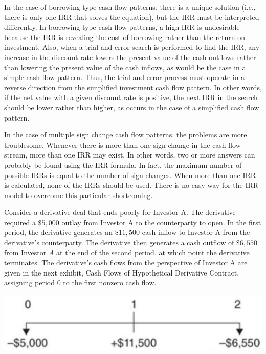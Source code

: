 \documentclass[11pt]{article}
\begin{document}
In the case of borrowing type cash flow patterns, there is a unique solution (i.e., there is only one IRR that solves the equation), but the IRR must be interpreted differently. In borrowing type cash flow patterns, a high IRR is undesirable because the IRR is revealing the cost of borrowing rather than the return on investment. Also, when a trial-and-error search is performed to find the IRR, any increase in the discount rate lowers the present value of the cash outflows rather than lowering the present value of the cash inflows, as would be the case in a simple cash flow pattern. Thus, the trial-and-error process must operate in a reverse direction from the simplified investment cash flow pattern. In other words, if the net value with a given discount rate is positive, the next IRR in the search should be lower rather than higher, as occurs in the case of a simplified cash flow pattern.

In the case of multiple sign change cash flow patterns, the problems are more troublesome. Whenever there is more than one sign change in the cash flow stream, more than one IRR may exist. In other words, two or more answers can probably be found using the IRR formula. In fact, the maximum number of possible IRRs is equal to the number of sign changes. When more than one IRR is calculated, none of the IRRs should be used. There is no easy way for the IRR model to overcome this particular shortcoming.

Consider a derivative deal that ends poorly for Investor A. The derivative required a $\$ 5,000$ outlay from Investor A to the counterparty to open. In the first period, the derivative generates an $\$ 11,500$ cash inflow to Investor A from the derivative's counterparty. The derivative then generates a cash outflow of $\$ 6,550$ from Investor $A$ at the end of the second period, at which point the derivative terminates. The derivative's cash flows from the perspective of Investor A are given in the next exhibit, Cash Flows of Hypothetical Derivative Contract, assigning period 0 to the first nonzero cash flow.

\begin{center}
\includegraphics[max width=\textwidth]{2024_04_10_6f0546190ca30f08bc91g-2}
\end{center}
\end{document}

